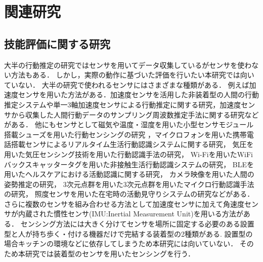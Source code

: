 \chapter{関連研究}
\section{技能評価に関する研究}
大半の行動推定の研究ではセンサを用いてデータ収集しているがセンサを使わない方法\cite{マイクロブログにおけるユーザの属性と習慣行動の推定に関する研究}もある．
しかし，実際の動作に基づいた評価を行いたい本研究では向いていない．
大半の研究で使われるセンサにはさまざまな種類がある．
例えば加速度センサを用いた方法がある．加速度センサを活用した非装着型の人間の行動推定システム\cite{加速度センサを活用した非装着型の人間の行動推定システム}や単一3軸加速度センサによる行動推定に関する研究\cite{単一3軸加速度センサによる行動推定}，加速度センサから収集した人間行動データのサンプリング周波数推定手法に関する研究\cite{加速度センサから収集した人間行動データのサンプリング周波数推定手法}などがある．
他にもセンサとして磁気や温度・湿度を用いた小型センサモジュール搭載シューズを用いた行動センシングの研究\cite{小型センサモジュール搭載シューズを用いた行動センシング}
，マイクロフォンを用いた携帯電話搭載センサによるリアルタイム生活行動認識システムに関する研究\cite{携帯電話搭載センサによるリアルタイム生活行動認識システム}，
気圧を用いた気圧センシング技術を用いた行動認識手法の研究\cite{気圧センシング技術を用いた行動認識手法}，
Wi-Fiを用いたWiFiバックスキャッタータグを用いた非接触生活行動認識システムの研究\cite{WiFiバックスキャッタータグを用いた非接触生活行動認識システムの提案}，
BLEを用いたヘルスケアにおける活動認識に関する研究\cite{Multimodal Wearable Sensing for Fine-Grained Activity Recognition in Healthcare}，
カメラ映像を用いた人間の姿勢推定の研究\cite{GLPose: Global-Local Representation Learning for Human Pose Estimation}，
3次元点群を用いた3次元点群を用いたマイクロ行動認識手法の研究\cite{3次元点群を用いたマイクロ行動認識手法の提案}，
照度センサを用いた在宅時の活動見守りシステムの研究\cite{照度センサを用いた在宅時の活動見守りシステム}などがある．
さらに複数のセンサを組み合わせる方法として加速度センサに加えて角速度センサが内蔵された慣性センサ(IMU:Inertial Measurement Unit)を用いる方法がある\cite{Human Action Recognition Method Based on Wearable Inertial Sensor}\cite{Real-Time Joint Axes Estimation of the Hip and Knee Joint during Gait Using Inertial Sensors}\cite{歩行者自律測位における行動センシング知識の利用}．
センシング方法には大きく分けてセンサを場所に固定する必要のある設置型と人が持ち歩く・付ける機器だけで完結する装着型の2種類がある.
設置型の場合キッチンの環境などに依存してしまうため本研究には向いていない．
そのため本研究では装着型のセンサを用いたセンシングを行う．

